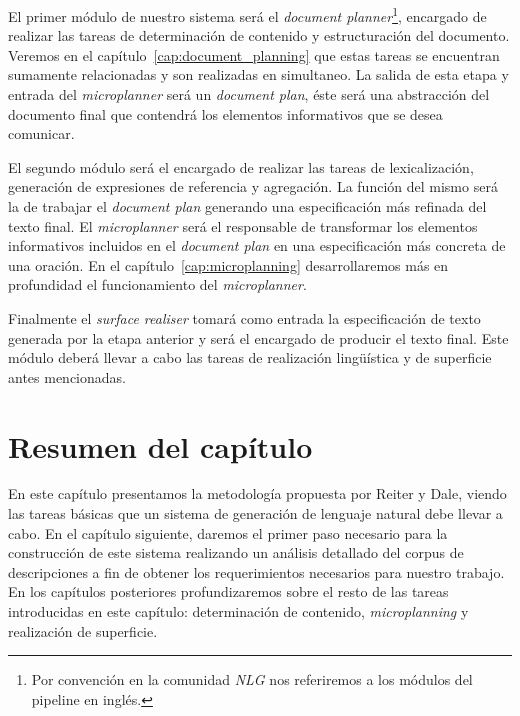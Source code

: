 El primer módulo de nuestro sistema será el \emph{document planner}\footnote{Por convención en la comunidad \textit{NLG} nos referiremos a los módulos del {pipeline} en inglés.}, encargado de realizar las tareas de determinación de contenido y estructuración del documento. Veremos en el capítulo~\ref{cap:document_planning} que estas tareas se encuentran sumamente relacionadas y son realizadas en simultaneo. La salida de esta etapa y entrada del \emph{microplanner} será un \emph{document plan}, éste será una abstracción del documento final que contendrá los elementos informativos que se desea comunicar.

El segundo módulo será el encargado de realizar las tareas de lexicalización, generación de expresiones de referencia y agregación. La función del mismo será la de trabajar el \textit{document plan} generando una especificación más refinada del texto final. El \emph{microplanner} será el responsable de transformar los elementos informativos incluidos en el \textit{document plan} en una especificación más concreta de una oración. En el capítulo~\ref{cap:microplanning} desarrollaremos más en profundidad el funcionamiento del \textit{microplanner}.

Finalmente el \emph{surface realiser} tomará como entrada la especificación de texto generada por la etapa anterior y será el encargado de producir el texto final. Este módulo deberá llevar a cabo las tareas de realización lingüística y de superficie antes mencionadas.

\section{Resumen del capítulo}
En este capítulo presentamos la metodología propuesta por Reiter y Dale, viendo las tareas básicas que un sistema de generación de lenguaje natural debe llevar a cabo. En el capítulo siguiente, daremos el primer paso necesario para la construcción de este sistema realizando un análisis detallado del corpus de descripciones a fin de obtener los requerimientos necesarios para nuestro trabajo. En los capítulos posteriores profundizaremos sobre el resto de las tareas introducidas en este capítulo: determinación de contenido, \textit{microplanning} y realización de superficie.